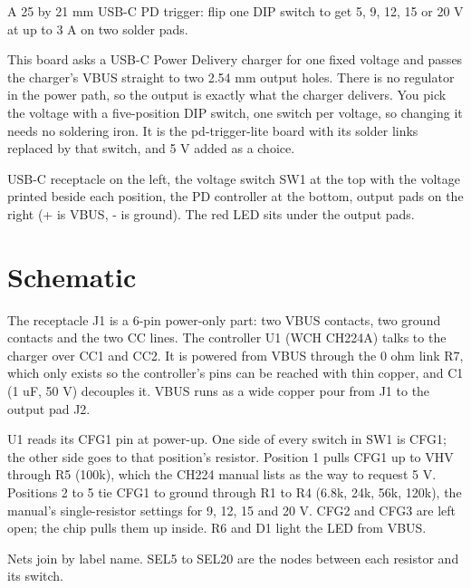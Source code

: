 


%
{A 25 by 21 mm USB-C PD trigger: flip one DIP switch to get 5, 9, 12, 15 or 20 V at up to 3 A on two solder pads.}

This board asks a USB-C Power Delivery charger for one fixed voltage and passes the charger's
VBUS straight to two 2.54 mm output holes. There is no regulator in the power path, so the output
is exactly what the charger delivers. You pick the voltage with a five-position DIP switch, one
switch per voltage, so changing it needs no soldering iron. It is the pd-trigger-lite board with
its solder links replaced by that switch, and 5 V added as a choice.

%
{USB-C receptacle on the left, the voltage switch SW1 at the top with the voltage printed beside
each position, the PD controller at the bottom, output pads on the right (+ is VBUS, - is ground).
The red LED sits under the output pads.}

\newpage
\section{Schematic}

The receptacle J1 is a 6-pin power-only part: two VBUS contacts, two ground contacts and the two
CC lines. The controller U1 (WCH CH224A) talks to the charger over CC1 and CC2. It is powered
from VBUS through the 0 ohm link R7, which only exists so the controller's pins can be reached
with thin copper, and C1 (1 uF, 50 V) decouples it. VBUS runs as a wide copper pour from J1 to
the output pad J2.

U1 reads its CFG1 pin at power-up. One side of every switch in SW1 is CFG1; the other side goes
to that position's resistor. Position 1 pulls CFG1 up to VHV through R5 (100k), which the CH224
manual lists as the way to request 5 V. Positions 2 to 5 tie CFG1 to ground through R1 to R4
(6.8k, 24k, 56k, 120k), the manual's single-resistor settings for 9, 12, 15 and 20 V. CFG2 and
CFG3 are left open; the chip pulls them up inside. R6 and D1 light the LED from VBUS.

%
{Nets join by label name. SEL5 to SEL20 are the nodes between each resistor and its switch.}

